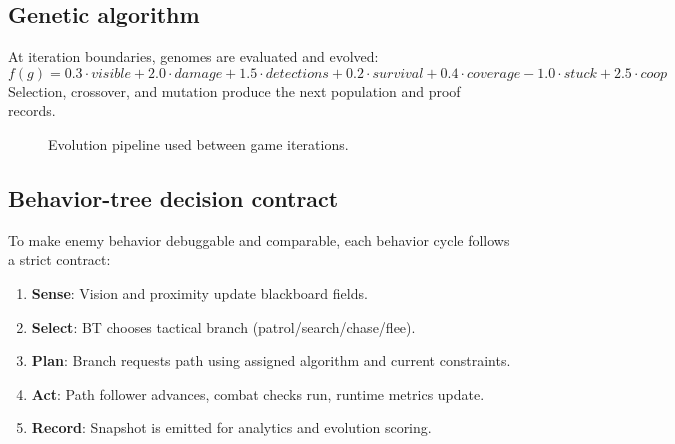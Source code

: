 \documentclass[11pt,a4paper,twoside]{article}
\begin{document}
\subsection{Genetic algorithm}
At iteration boundaries, genomes are evaluated and evolved:
\[
f(g)=0.3\cdot visible + 2.0\cdot damage + 1.5\cdot detections + 0.2\cdot survival + 0.4\cdot coverage - 1.0\cdot stuck + 2.5\cdot coop
\]
Selection, crossover, and mutation produce the next population and proof records.

\begin{figure}[htbp]
\centering
{}
\caption{Evolution pipeline used between game iterations.}
\label{fig:gapipe}
\end{figure}

\subsection{Behavior-tree decision contract}
To make enemy behavior debuggable and comparable, each behavior cycle follows a strict contract:
\begin{enumerate}[leftmargin=6mm]
  \item \textbf{Sense}: Vision and proximity update blackboard fields.
  \item \textbf{Select}: BT chooses tactical branch (patrol/search/chase/flee).
  \item \textbf{Plan}: Branch requests path using assigned algorithm and current constraints.
  \item \textbf{Act}: Path follower advances, combat checks run, runtime metrics update.
  \item \textbf{Record}: Snapshot is emitted for analytics and evolution scoring.
\end{enumerate}
\end{document}
